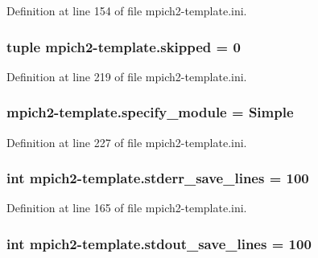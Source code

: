 Definition at line 154 of file mpich2-\/template.\-ini.

\hypertarget{namespacempich2-template_a082338bf19ff413c63167b2cf16d7cc2}{
\subsubsection[{skipped}]{\setlength{\rightskip}{0pt plus 5cm}tuple mpich2-\/template.\-skipped = 0}}\label{namespacempich2-template_a082338bf19ff413c63167b2cf16d7cc2}


Definition at line 219 of file mpich2-\/template.\-ini.

\hypertarget{namespacempich2-template_a3dc27698e45451e7a109f66bbeddd7bf}{
\subsubsection[{specify\-\_\-module}]{\setlength{\rightskip}{0pt plus 5cm}mpich2-\/template.\-specify\-\_\-module = Simple}}\label{namespacempich2-template_a3dc27698e45451e7a109f66bbeddd7bf}


Definition at line 227 of file mpich2-\/template.\-ini.

\hypertarget{namespacempich2-template_a4526a47057dcced7297a2eb36bc0f73c}{
\subsubsection[{stderr\-\_\-save\-\_\-lines}]{\setlength{\rightskip}{0pt plus 5cm}int mpich2-\/template.\-stderr\-\_\-save\-\_\-lines = 100}}\label{namespacempich2-template_a4526a47057dcced7297a2eb36bc0f73c}


Definition at line 165 of file mpich2-\/template.\-ini.

\hypertarget{namespacempich2-template_af6c50bb5f1dbba22780519e1035267d5}{
\subsubsection[{stdout\-\_\-save\-\_\-lines}]{\setlength{\rightskip}{0pt plus 5cm}int mpich2-\/template.\-stdout\-\_\-save\-\_\-lines = 100}}\label{namespacempich2-template_af6c50bb5f1dbba22780519e1035267d5}


